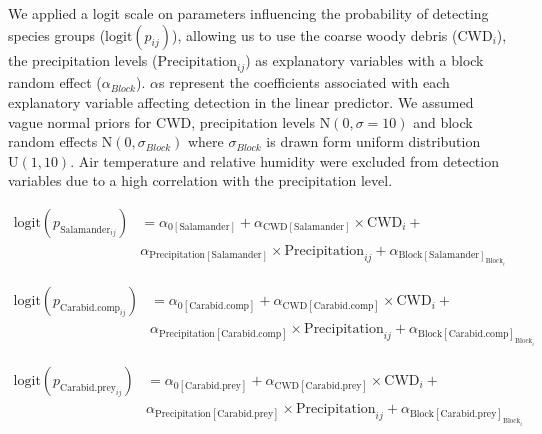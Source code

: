 We applied a logit scale on parameters influencing the probability of detecting species groups ($\text{logit}(p_{ij})$), allowing us to use 
the coarse woody debris ($\text{CWD}_i$), the precipitation levels ($\text{Precipitation}_{ij}$) as explanatory variables with a block random effect ($\alpha_{Block}$). 
$\alpha$s represent the coefficients associated with each explanatory variable affecting detection in the linear predictor. 
We assumed vague normal priors for CWD, precipitation levels $\text{N}(0, \sigma = 10)$ and block random effects $\text{N}(0, \sigma_{Block})$ 
where $\sigma_{Block}$ is drawn form uniform distribution $\text{U}(1, 10)$. 
Air temperature and relative humidity were excluded from detection variables due to a high correlation with the precipitation level.


\begin{align}
  \text{logit}(p_{\text{Salamander}_{ij}}) &= \alpha_{0[\text{Salamander}]} + \alpha_{\text{CWD}[\text{Salamander}]} \times \text{CWD}_i + \nonumber \\
  &\alpha_{\text{Precipitation}[\text{Salamander}]} \times \text{Precipitation}_{ij} + \alpha_{\text{Block}[\text{Salamander}]_{\text{Block}_i}} \nonumber
\end{align}

\begin{align}
  \text{logit}(p_{\text{Carabid.comp}_{ij}}) &= \alpha_{0[\text{Carabid.comp}]} + \alpha_{\text{CWD}[\text{Carabid.comp}]} \times \text{CWD}_i + \\
  &\alpha_{\text{Precipitation}[\text{Carabid.comp}]} \times \text{Precipitation}_{ij} + \alpha_{\text{Block}[\text{Carabid.comp}]_{\text{Block}_i}} \nonumber 
\end{align}

\begin{align}
  \text{logit}(p_{\text{Carabid.prey}_{ij}}) &= \alpha_{0[\text{Carabid.prey}]} + \alpha_{\text{CWD}[\text{Carabid.prey}]} \times \text{CWD}_i + \nonumber \\
  &\alpha_{\text{Precipitation}[\text{Carabid.prey}]} \times \text{Precipitation}_{ij} + \alpha_{\text{Block}[\text{Carabid.prey}]_{\text{Block}_i}} \nonumber 
\end{align}




